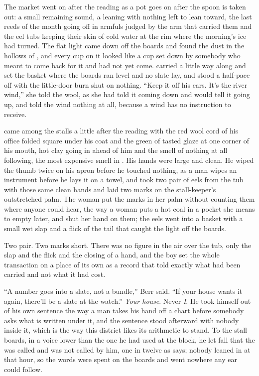The market went on after the reading as a pot goes on after the spoon is taken out: a small remaining sound, a leaning with nothing left to lean toward, the last reeds of the month going off in armfuls judged by the arm that carried them and the eel tubs keeping their skin of cold water at the rim where the morning's ice had turned. The flat light came down off the boards and found the dust in the hollows of , and every cup on it looked like a cup set down by somebody who meant to come back for it and had not yet come.  carried  a little way along  and set the basket where the boards ran level and no slate lay, and stood a half-pace off with the little-door burn shut on nothing. “Keep it off his ears. It's the river wind,” she told the wool, as she had told it coming down and would tell it going up, and told the wind nothing at all, because a wind has no instruction to receive.

 came among the stalls a little after the reading with the red wool cord of his office folded square under his coat and the green of tasted glaze at one corner of his mouth, hot clay going in ahead of him and the smell of nothing at all following, the most expensive smell in . His hands were large and clean. He wiped the thumb twice on his apron before he touched nothing, as a man wipes an instrument before he lays it on a towel, and took two pair of eels from the tub with those same clean hands and laid two marks on the stall-keeper's outstretched palm. The woman put the marks in her palm without counting them where anyone could hear, the way a woman puts a hot coal in a pocket she means to empty later, and shut her hand on them; the eels went into a basket with a small wet slap and a flick of the tail that caught the light off the boards.

Two pair. Two marks short. There was no figure in the air over the tub, only the slap and the flick and the closing of a hand, and the boy set the whole transaction on a place of its own as a record that told exactly what had been carried and not what it had cost.

“A number goes into a slate, not a bundle,” Berr said. “If your house wants it again, there'll be a slate at the watch.” \emph{Your house}. Never \emph{I}. He took himself out of his own sentence the way a man takes his hand off a chart before somebody asks what is written under it, and the sentence stood afterward with nobody inside it, which is the way this district likes its arithmetic to stand. To the stall boards, in a voice lower than the one he had used at the block, he let fall that the  was called and was not called by him, one in twelve as  says; nobody leaned in at that hour, so the words were spent on the boards and went nowhere any ear could follow.

